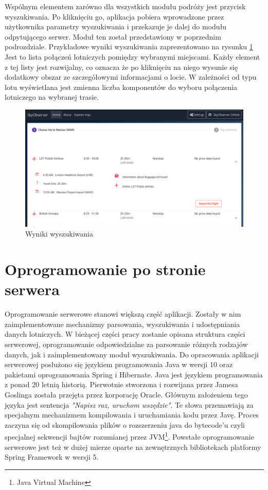 \documentclass[12pt, twoside]{report}
\begin{document}
Wspólnym elementem zarówno dla wszystkich modułu podróży jest przycisk wyszukiwania. Po kliknięciu go, aplikacja pobiera wprowadzone przez użytkownika parametry wyszukiwania i przekazuje je dalej do modułu odpytującego serwer. Moduł ten został przedstawiony w poprzednim podrozdziale. Przykładowe wyniki wyszukiwania zaprezentowano na rysunku \ref{fig:result_component} Jest to lista połączeń lotniczych pomiędzy wybranymi miejscami. Każdy element z tej listy jest rozwijalny, co oznacza że po kliknięciu na niego wysunie się dodatkowy obszar ze szczegółowymi informacjami o locie. W zależności od typu lotu wyświetlana jest zmienna liczba komponentów do wyboru połączenia lotniczego na wybranej trasie.
\begin{figure}[!ht]
\centering
\includegraphics[scale=0.40, keepaspectratio]{result_component.png}
\caption{Wyniki wyszukiwania}
\label{fig:result_component}
\end{figure}

\section{Oprogramowanie po stronie serwera}
Oprogramowanie serwerowe stanowi większą część aplikacji. Zostały w nim zaimplementowane mechanizmy parsowania, wyszukiwania i udostępniania danych lotniczych. W bieżącej części pracy zostanie opisana struktura części serwerowej, oprogramowanie odpowiedzialne za parsowanie różnych rodzajów danych, jak i zaimplementowany moduł wyszukiwania.
Do opracowania aplikacji serwerowej posłużono się językiem programowania Java w wersji 10 oraz pakietami oprogramowania Spring i Hibernate. Java jest językiem programowania z ponad 20 letnią historią. Pierwotnie stworzona i rozwijana przez Jamesa Goslinga została przejęta przez korporację Oracle. Głównym założeniem tego języka jest sentencja \textit{"Napisz raz, uruchom wszędzie"}. Te słowa przemawiają za specjalnym mechanizmem kompilowania i uruchamiania kodu przez Javę. Proces zaczyna się od skompilowania plików o rozszerzeniu java do bytecode'u czyli specjalnej sekwencji bajtów rozumianej przez JVM\footnote{Java Virtual Machine}\cite{jvm}.
Powstałe oprogramowanie serwerowe jest też w dużej mierze oparte na zewnętrznych bibliotekach platformy Spring Framework w wersji 5.
\end{document}
